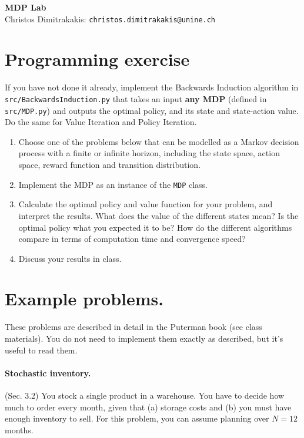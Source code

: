 \documentclass[twoside,a4paper]{article}
\begin{document}
\Large{\bf MDP Lab}
\vspace{1em}
\\
\large{Christos Dimitrakakis:} \texttt{christos.dimitrakakis@unine.ch}

\section{Programming exercise}
\begin{exercise} If you have not done it already, implement the Backwards Induction algorithm in \verb!src/BackwardsInduction.py! that takes an input \textbf{any MDP} (defined in \verb|src/MDP.py|) and outputs the optimal policy, and its state and state-action value. Do the same for Value Iteration and Policy Iteration.
  
\end{exercise}

\begin{exercise}
  \begin{enumerate}  
  \item Choose one of the problems below that can be modelled as a Markov decision process with a finite or infinite horizon, including the state space, action space, reward function and transition distribution. 
  \item Implement the MDP as an instance of the \verb|MDP| class.
  \item Calculate the optimal policy and value function for your problem, and interpret the results. What does the value of the different states mean? Is the optimal policy what you expected it to be? How do the different algorithms compare in terms of computation time and convergence speed?
  \item Discuss your results in class.
  \end{enumerate}
\end{exercise}

\iftrue
  \section{Example problems.}
  These problems are described in detail in the Puterman book (see class materials). You do not need to implement them exactly as described, but it's useful to read them. 
  
  \paragraph{Stochastic inventory.}  (Sec. 3.2) You stock a single product in a warehouse. You have to decide how much to order every month, given that (a) storage costs and (b) you must have enough inventory to sell. For this problem, you can assume planning over $N=12$ months. 
\end{document}
